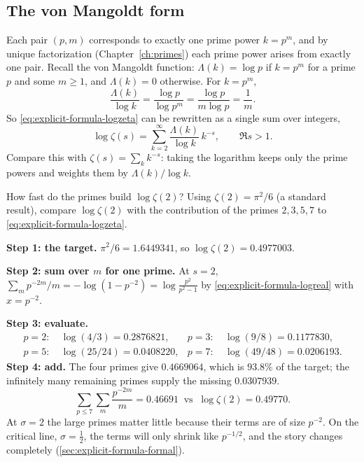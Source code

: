 \subsection{The von Mangoldt form}

Each pair $(p,m)$ corresponds to exactly one prime power $k=p^m$, and by unique factorization (Chapter~\ref{ch:primes}) each prime power arises from exactly one pair. Recall the von Mangoldt function: $\Lambda(k)=\log p$ if $k=p^m$ for a prime $p$ and some $m\ge1$, and $\Lambda(k)=0$ otherwise. For $k=p^m$,
\[
\frac{\Lambda(k)}{\log k}=\frac{\log p}{\log p^{m}}=\frac{\log p}{m\log p}=\frac1m .
\]
So \cref{eq:explicit-formula-logzeta} can be rewritten as a single sum over integers,
\begin{equation}
\log\zeta(s)=\sum_{k=2}^{\infty}\frac{\Lambda(k)}{\log k}\,k^{-s},\qquad\Re s>1 .
\label{eq:explicit-formula-mangoldt}
\end{equation}
Compare this with $\zeta(s)=\sum_k k^{-s}$: taking the logarithm keeps only the prime powers and weights them by $\Lambda(k)/\log k$.

\begin{sample}{How fast do the primes build $\log\zeta(2)$?}
Using $\zeta(2)=\pi^2/6$ (a standard result), compare $\log\zeta(2)$ with the contribution of the primes $2,3,5,7$ to \cref{eq:explicit-formula-logzeta}.

\textbf{Step 1: the target.} $\pi^2/6=1.6449341$, so $\log\zeta(2)=0.4977003$.

\textbf{Step 2: sum over $m$ for one prime.} At $s=2$, $\sum_m p^{-2m}/m=-\log(1-p^{-2})=\log\frac{p^2}{p^2-1}$ by \cref{eq:explicit-formula-logreal} with $x=p^{-2}$.

\textbf{Step 3: evaluate.}
\begin{align*}
p=2:&\ \log(4/3)=0.2876821, & p=3:&\ \log(9/8)=0.1177830,\\
p=5:&\ \log(25/24)=0.0408220, & p=7:&\ \log(49/48)=0.0206193.
\end{align*}
\textbf{Step 4: add.} The four primes give $0.4669064$, which is $93.8\%$ of the target; the infinitely many remaining primes supply the missing $0.0307939$.
\[
\boxed{\textstyle\sum_{p\le7}\sum_m \frac{p^{-2m}}{m}=0.46691\ \text{ vs }\ \log\zeta(2)=0.49770.}
\]
At $\sigma=2$ the large primes matter little because their terms are of size $p^{-2}$. On the critical line, $\sigma=\tfrac12$, the terms will only shrink like $p^{-1/2}$, and the story changes completely (\cref{sec:explicit-formula-formal}).
\end{sample}

